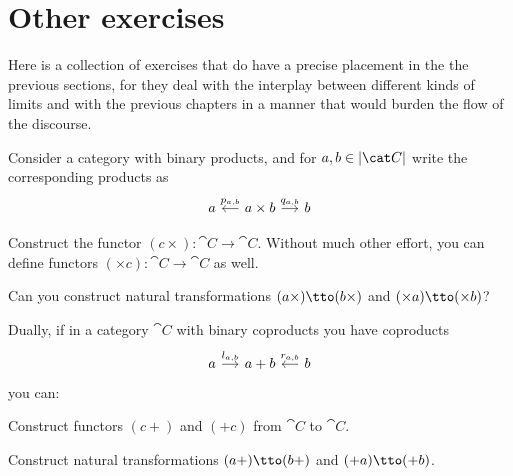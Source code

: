 
\section{Other exercises}

Here is a collection of exercises that do have a precise placement in the the previous sections, for they deal with the interplay between different kinds of limits and with the previous chapters in a manner that would burden the flow of  the discourse.

\begin{exercise}
Consider a category with binary products, and for \(a, b \in \obj{\cat C}\) write the corresponding products as
\[\begin{tikzcd}[column sep=small]
a & a \times b \ar["{p_{a,b}}", l, swap] \ar["{q_{a,b}}", r] & b
\end{tikzcd}\]
\begin{tcbenum}
\item Construct the functor \((c \times) : \cat C \to \cat C\). Without much other effort, you can define functors \((\times c) : \cat C \to \cat C\) as well.
\item Can you construct natural transformations \((a \times) \tto (b \times)\) and \((\times a) \tto (\times b)\)?
\end{tcbenum}
Dually, if in a category \(\cat C\) with binary coproducts you have coproducts
\[\begin{tikzcd}[column sep=small]
a \ar["{l_{a,b}}", r] & a+b & b \ar["{r_{a,b}}", l, swap]
\end{tikzcd}\]
you can:
\begin{tcbenum}
\item Construct functors \((c +)\) and \((+ c)\) from \(\cat C\) to \(\cat C\).
\item Construct natural transformations \((a +) \tto (b +)\) and \((+ a) \tto (+ b)\).
\end{tcbenum}
\end{exercise}

